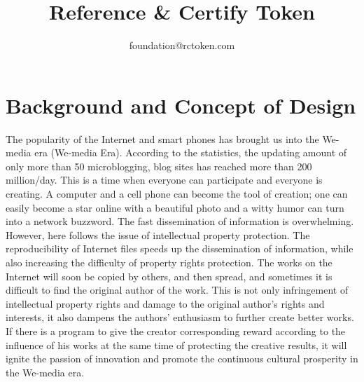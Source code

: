 \documentclass[a4paper,oneside,openany]{tufte-book}
\title{Reference \& Certify Token}
\author{foundation@rctoken.com}
\begin{document}
\maketitle
\tableofcontents


































\chapter{Background and Concept of Design}

The popularity of the Internet and smart phones has brought us into the We-media era (We-media Era). According to the statistics, the updating amount of only more than 50 microblogging, blog sites has reached more than 200 million/day. This is a time when everyone can participate and everyone is creating. A computer and a cell phone can become the tool of creation; one can easily become a star online with a beautiful photo and a witty humor can turn into a network buzzword. The fast dissemination of information is overwhelming. However, here follows the issue of intellectual property protection. The reproducibility of Internet files speeds up the dissemination of information, while also increasing the difficulty of property rights protection. The works on the Internet will soon be copied by others, and then spread, and sometimes it is difficult to find the original author of the work. This is not only infringement of intellectual property rights and damage to the original author's rights and interests, it also dampens the authors' enthusiasm to further create better works. If there is a program to give the creator corresponding reward according to the influence of his works at the same time of protecting the creative results, it will ignite the passion of innovation and promote the continuous cultural prosperity in the We-media era.    
\end{document}
